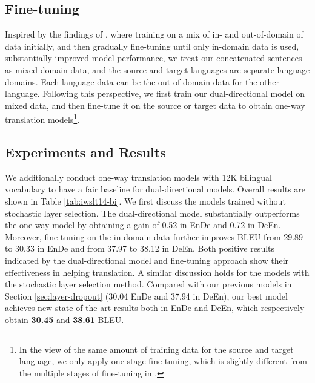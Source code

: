 \documentclass[11pt]{article}
\begin{document}
\subsection{Fine-tuning}
Inspired by the findings of \citet{xu-etal-2021-gradual}, where training on a mix of in- and out-of-domain of data initially, and then gradually fine-tuning until only in-domain data is used, substantially improved model performance, we treat our concatenated sentences as mixed domain data, and the source and target languages are separate language domains. Each language data can be the out-of-domain data for the other language. Following this perspective, we first train our dual-directional model on mixed data, and then fine-tune it on the source or target data to obtain one-way translation models\footnote{In the view of the same amount of training data for the source and target language, we only apply one-stage fine-tuning, which is slightly different from the multiple stages of fine-tuning in \citet{xu-etal-2021-gradual}.}. 

\subsection{Experiments and Results}
We additionally conduct one-way translation models with 12K bilingual vocabulary to have a fair baseline for dual-directional models. Overall results are shown in Table \ref{tab:iwslt14-bi}. We first discuss the models trained without stochastic layer selection. The dual-directional model substantially outperforms the one-way model by obtaining a gain of 0.52 in EnDe and 0.72 in DeEn. Moreover, fine-tuning on the in-domain data further improves BLEU from 29.89 to 30.33 in EnDe and from 37.97 to 38.12 in DeEn. Both positive results indicated by the dual-directional model and fine-tuning approach show their effectiveness in helping translation. A similar discussion holds for the models with the stochastic layer selection method. Compared with our previous models in Section \ref{sec:layer-dropout} (30.04 EnDe and 37.94 in DeEn), our best model achieves new state-of-the-art results both in EnDe and DeEn, which respectively obtain \textbf{30.45} and \textbf{38.61} BLEU. 
\end{document}
